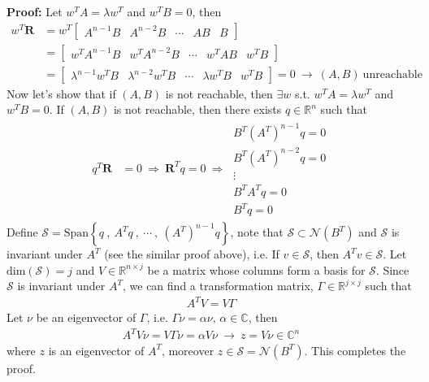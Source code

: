 \documentclass[twoside]{article}
\begin{document}
\textbf{Proof:} Let $w^T A = \lambda w^T$ and $w^T B = 0$, then
%
\begin{align*}
 w^T \mathbf{R} &= w^T \left[ \begin{array}{c|c|c|c|c} A^{n-1} B & A^{n-2} B &
         \cdots & A B & B \end{array} \right] 
         \\
  &= \left[ \begin{array}{c|c|c|c|c} w^T A^{n-1} B & w^T A^{n-2} B &
         \cdots & w^T A B & w^T B \end{array} \right] 
         \\
&= \left[ \begin{array}{c|c|c|c|c} \lambda^{n-1} w^T B & \lambda^{n-2} w^T B &
         \cdots & \lambda w^T  B & w^T B \end{array} \right] = 0 \ \rightarrow \ (A,B) \ \mathrm{unreachable} 
\end{align*}
%
Now let's show that if $(A,B)$ is not reachable, then $\exists w$ s.t. $w^T A = \lambda w^T$ and $w^T B = 0$.  If $(A,B)$ is not reachable, then there exists $q \in \mathbb{R}^n$ such that
%
\begin{align*}
q^T \mathbf{R} &= 0 \ \Rightarrow \ \mathbf{R}^T q = 0 
\ \Rightarrow \ \begin{array}{c} B^T (A^T)^{n-1} q = 0 \\ B^T (A^T)^{n-2} q = 0 \\
         \vdots \\ B^T A^T q = 0 \\ B^T q = 0 \end{array} 
\end{align*}
%
Define $\mathcal{S} = \mathrm{Span} \left\lbrace q \ , \ A^T q \ , \ \cdots \ , \  (A^T)^{n-1} q \right\rbrace$, note that 
$\mathcal{S} \subset \mathcal{N}(B^T)$ and $\mathcal{S}$ is invariant under $A^T$ (see the similar proof above), i.e. 
If $v \in \mathcal{S}$, then $A^T v \in \mathcal{S}$. Let $\mathrm{dim} (\mathcal{S}) = j$ and $V \in \mathbb{R}^{n \times j}$ 
be a matrix whose columns form a basis for $\mathcal{S}$. Since $\mathcal{S}$ is invariant under $A^T$, we can find a transformation
matrix, $\Gamma \in \mathbb{R}^{j \times j}$ such that 
%
\begin{align*}
A^T V = V \Gamma
\end{align*}
%
Let $\nu$ be an eigenvector of $\Gamma$, i.e. $\Gamma \nu = \alpha \nu , \, \alpha \in \mathbb{C}$, then 
%
\begin{align*}
A^T V \nu = V \Gamma \nu = \alpha V \nu \ \rightarrow \ z = V \nu \in \mathbb{C}^n
\end{align*}
%
where $z$ is an eigenvector of $A^T$, moreover $z \in \mathcal{S} = \mathcal{N}(B^T)$. This completes the proof. 
\end{document}
